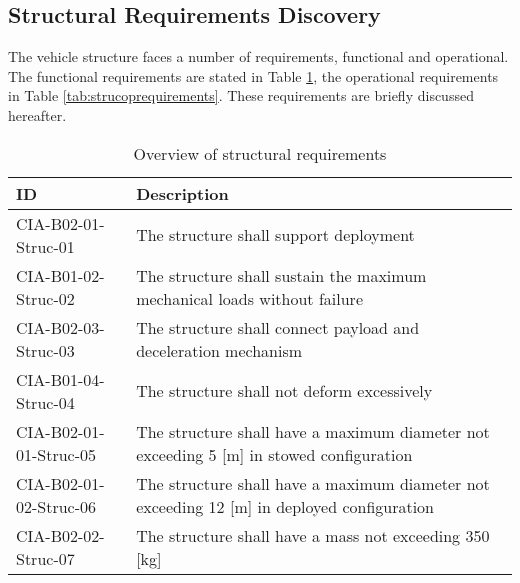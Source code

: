 \subsection{Structural Requirements Discovery} \label{sec:struct}
The vehicle structure faces a number of requirements, functional and operational. The functional requirements are stated in Table \ref{tab:strucfuncrequirements}, the operational requirements in Table \ref{tab:strucoprequirements}. These requirements are briefly discussed hereafter.
\begin{table}[H]
	\caption{Overview of structural requirements}
	\begin{tabular}{|p{}|p{}|}
    \hline
    ID          & Description                                                                                                      \\ \hline \hline
    CIA-B02-01-Struc-01 & The structure shall support deployment \\ \hline
    CIA-B01-02-Struc-02 & The structure shall sustain the maximum mechanical loads without failure                           \\ \hline
    CIA-B02-03-Struc-03 & The structure shall connect payload and deceleration mechanism \\ \hline
    CIA-B01-04-Struc-04 & The structure shall not deform excessively \\ \hline
    CIA-B02-01-01-Struc-05 & The structure shall have a maximum diameter not exceeding 5 [m] in stowed configuration                              \\ \hline
    CIA-B02-01-02-Struc-06 & The structure shall have a maximum diameter not exceeding 12 [m] in deployed configuration     \\ \hline
    CIA-B02-02-Struc-07 & The structure shall have a mass not exceeding 350 [kg]\\ \hline
    \end{tabular}
    \label{tab:strucfuncrequirements}
\end{table}
